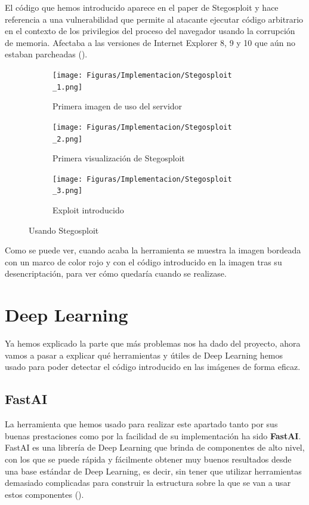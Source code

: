 El código que hemos introducido aparece en el paper de Stegosploit y hace referencia a una vulnerabilidad que permite al atacante ejecutar código arbitrario en el contexto de los privilegios del proceso del navegador usando la corrupción de memoria. Afectaba a las versiones de Internet Explorer 8, 9 y 10 que aún no estaban parcheadas (\cite{CVE-2014-0282}). %

\begin{figure}[H]
  \centering
  \begin{subfigure}[H]{0.45\linewidth}
  	\texttt{[image: Figuras/Implementacion/Stegosploit\\\_1.png]}
  	\label{fig:stegosploit-uso}
  	\caption{Primera imagen de uso del servidor}
  \end{subfigure}
  \begin{subfigure}[H]{0.45\linewidth}
  	\texttt{[image: Figuras/Implementacion/Stegosploit\\\_2.png]}
  	\label{fig:stegosploit-uso-2}
  	\caption{Primera visualización de Stegosploit}
  \end{subfigure}
  \begin{subfigure}[H]{0.45\linewidth}
  	\texttt{[image: Figuras/Implementacion/Stegosploit\\\_3.png]}
  	\label{fig:stegosploit-uso-3}
  	\caption{Exploit introducido}
  \end{subfigure}
  \caption{Usando Stegosploit}
\end{figure}

Como se puede ver, cuando acaba la herramienta se muestra la imagen bordeada con un marco de color rojo y con el código introducido en la imagen tras su desencriptación, para ver cómo quedaría cuando se realizase.

\section{Deep Learning}
\label{sec:fastai}

Ya hemos explicado la parte que más problemas nos ha dado del proyecto, ahora vamos a pasar a explicar qué herramientas y útiles de Deep Learning hemos usado para poder detectar el código introducido en las imágenes de forma eficaz.

\subsection{FastAI}

La herramienta que hemos usado para realizar este apartado tanto por sus buenas prestaciones como por la facilidad de su implementación ha sido \textbf{FastAI}. FastAI es una librería de Deep Learning que brinda de componentes de alto nivel, con los que se puede rápida y fácilmente obtener muy buenos resultados desde una base estándar de Deep Learning, es decir, sin tener que utilizar herramientas demasiado complicadas para construir la estructura sobre la que se van a usar estos componentes (\cite{fastai}). %

